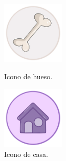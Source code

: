 \documentclass[a4paper, 12pt]{article}
\begin{document}
\begin{figure}[H]
   	\begin{minipage}{0.48\textwidth}
		\begin{center}
			{\includegraphics[width=3cm]{logo/Protectora.png}\par}
			\caption{Icono de hueso.}
		\end{center}  
	\end{minipage}\hfill
   	\begin{minipage}{0.48\textwidth}
		\begin{center}
			{\includegraphics[width=3cm]{logo/Casa.png}\par}
			\caption{Icono de casa.}
		\end{center}  
	\end{minipage}\hfill
\end{figure}
\end{document}
